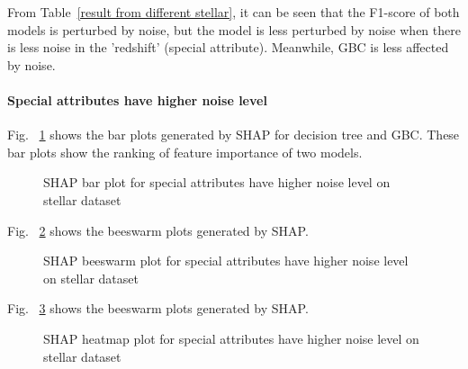 \documentclass[runningheads,a4paper]{llncs}
\begin{document}
From Table~\ref{result from different stellar}, it can be seen that the F1-score of both models is perturbed by noise, but the model is less perturbed by noise when there is less noise in the 'redshift' (special attribute). Meanwhile, GBC is less affected by noise.

\paragraph{Special attributes have higher noise level}
Fig. ~\ref{bar plots special rough noise stellar} shows the bar plots generated by SHAP for decision tree and GBC. These bar plots show the ranking of feature importance of two models.
\begin{figure}[H]
	\centering
	
	\hfill
	
	
	\caption{SHAP bar plot for special attributes have higher noise level on stellar dataset}
	\label{bar plots special rough noise stellar}
\end{figure}



Fig. ~\ref{bee plots special rough noise stellar} shows the beeswarm plots generated by SHAP.
\begin{figure}[H]
	\centering
	
	\hfill
	
	
	\caption{SHAP beeswarm plot for special attributes have higher noise level on stellar dataset}
	\label{bee plots special rough noise stellar}
	
\end{figure}
Fig. ~\ref{heat plots special rough noise stellar} shows the beeswarm plots generated by SHAP.
\begin{figure}[H]
	\centering
	
	\hfill
	
	
	\caption{SHAP heatmap plot for special attributes have higher noise level on stellar dataset}
	\label{heat plots special rough noise stellar}
	
\end{figure}
\end{document}
